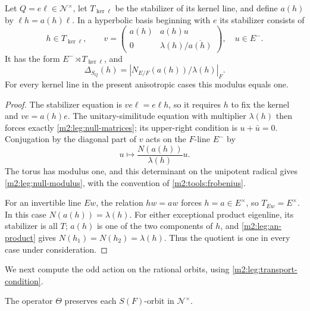 \begin{lemma}\label{m2:leg:null-stabilizer}
Let $Q=e\ell\in\mathcal N^\times$, let $T_{\ker\ell}$ be the
stabilizer of its kernel line, and define $a(h)$ by
$\ell h=a(h)\ell$. In a hyperbolic basis beginning with $e$ its
stabilizer consists of
\begin{equation}\label{m2:leg:null-matrices}
 h\in T_{\ker\ell},\qquad
 v=\begin{pmatrix}
 a(h)&a(h)u\\0&\lambda(h)/\overline{a(h)}
 \end{pmatrix},\quad u\in E^-.
\end{equation}
It has the form $E^-\rtimes T_{\ker\ell}$, and
\begin{equation}\label{m2:leg:null-modulus}
 \Delta_{S_Q}(h)=
       \left|N_{E/F}(a(h))/\lambda(h)\right|_F.
\end{equation}
For every kernel line in the present anisotropic cases this modulus
equals one.
\end{lemma}

\begin{proof}
The stabilizer equation is $v e\ell=e\ell h$, so it requires $h$
to fix the kernel and $ve=a(h)e$. The unitary-similitude equation
with multiplier $\lambda(h)$ then forces exactly
\eqref{m2:leg:null-matrices}; its upper-right condition is
$u+\bar u=0$. Conjugation by the diagonal part of $v$ acts on
the $F$-line $E^-$ by
\[
 u\longmapsto\frac{N(a(h))}{\lambda(h)}u.
\]
The torus has modulus one, and this determinant on the unipotent
radical gives \eqref{m2:leg:null-modulus}, with the convention of
\cref{m2:tools:frobenius}.

For an invertible line $Ew$, the relation $hw=aw$ forces $h=a\in E^\times$,
so $T_{Ew}=E^\times$. In this case $N(a(h))=\lambda(h)$.
For either exceptional product eigenline, its stabilizer is all $T$;
$a(h)$ is one of the two components of $h$, and
\eqref{m2:leg:an-product} gives $N(h_1)=N(h_2)=\lambda(h)$.
Thus the quotient is one in every case under consideration.
\end{proof}

We next compute the odd action on the rational orbits, using
\eqref{m2:leg:transport-condition}.

\begin{lemma}\label{m2:leg:null-odd}
The operator $\Theta$ preserves each $S(F)$-orbit in $\mathcal N^\times$.
\end{lemma}

